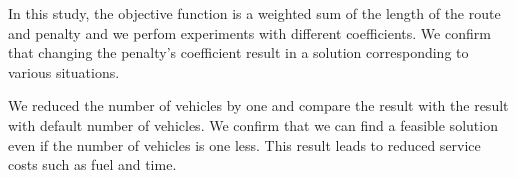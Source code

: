 In this study, the objective function is a weighted sum of the length of the route and penalty and we perfom experiments with different coefficients.
We confirm that changing the penalty's coefficient result in a solution corresponding to various situations.

We reduced the number of vehicles by one and compare the result with the result with default number of vehicles. We confirm that we can find a feasible solution even if the number of vehicles is one less.
This result leads to reduced service costs such as fuel and time.
